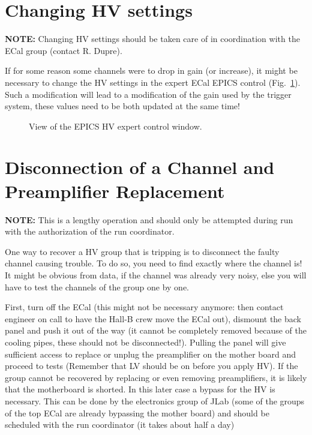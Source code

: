 \documentclass[12pt]{article}
\begin{document}
   \section{Changing HV settings}
      {\bf NOTE:} Changing HV settings should be taken care of in coordination with the ECal group (contact R. Dupre).

      If for some reason some channels were to drop in gain (or increase), it might be necessary to change the HV settings in the expert ECal EPICS control (Fig.~\ref{EHV}). Such a modification will lead to a modification of the gain used by the trigger system, these values need to be both updated at the same time!

\begin{figure}
\center
\caption{\small \label{EHV} View of the EPICS HV expert control window.}
\end{figure}


%

   \section{Disconnection of a Channel and Preamplifier Replacement}
      {\bf NOTE:} This is a lengthy operation and should only be attempted during run with the authorization of the run coordinator.

      One way to recover a HV group that is tripping is to disconnect the faulty 
      channel causing trouble. To do so, you need to find exactly where the 
      channel is! It might be obvious from data, if the channel was already very noisy, else you will have to test the channels of the group one by one.

      First, turn off the ECal (this might not be necessary anymore: then contact engineer on call to 
      have the Hall-B crew move the ECal out), dismount the back panel and push it out of the way 
      (it cannot be completely removed because of the cooling pipes, these should not be disconnected!). Pulling
      the panel will give sufficient access to replace or unplug the preamplifier 
      on the mother board and proceed to tests (Remember that LV should be on before you apply HV). If the group cannot be recovered by 
      replacing or even removing preamplifiers, it is likely that the motherboard is 
      shorted. In this later case a bypass for the HV is necessary. This can be done 
      by the electronics group of JLab (some of the groups of the top ECal are already 
      bypassing the mother board) and should be scheduled with the run coordinator (it takes about half a day) 
\end{document}
